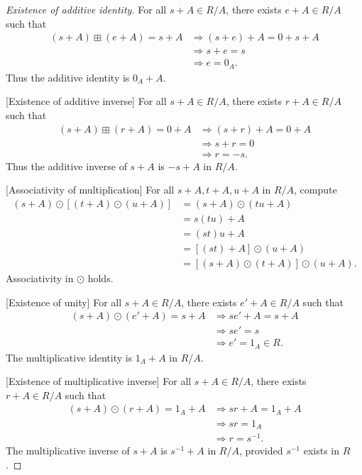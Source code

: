 \begin{proof}
    [Existence of additive identity] For all $s+A \in R/A$, there exists $e+A \in R/A$ such that 
    \begin{align*}
        (s + A) \boxplus (e+A) = s + A &\Rightarrow (s+e) + A = 0 + s + A\\
        &\Rightarrow s+e = s\\
        &\Rightarrow e = 0_A.
    \end{align*}
    Thus the additive identity is $0_A + A$.
    
    [Existence of additive inverse] For all $s+A \in R/A$, there exists $r+A \in R/A$ such that 
    \begin{align*}
        (s + A) \boxplus (r+A) = 0 + A &\Rightarrow (s+r) + A = 0 + A\\
        &\Rightarrow s+r = 0\\
        &\Rightarrow r =-s.
    \end{align*}
    Thus the additive inverse of $s+A$ is $-s+A$ in $R/A$.

    [Associativity of multiplication] For all $s+A, t+A, u+A$ in $R/A$, compute 
    \begin{align*}
        (s+A) \odot [(t+A) \odot (u+A)] &= (s+A) \odot (tu + A)\\
        &= s(tu) +A\\
        &= (st)u + A\\
        &= [(st)+A] \odot (u+A)\\
        &= [(s+A) \odot (t+A)] \odot (u+A).
    \end{align*}
    Associativity in $\odot$ holds.

    [Existence of unity] For all $s+A \in R/A$, there exists $e'+A \in R/A$ such that 
    \begin{align*}
        (s + A) \odot (e'+A) = s + A &\Rightarrow se'+A = s + A\\
        &\Rightarrow se' = s\\
        &\Rightarrow e' = 1_A \in R.
    \end{align*}
    The multiplicative identity is $1_A + A$ in $R/A$.

    [Existence of multiplicative inverse] For all $s+A \in R/A$, there exists $r+A \in R/A$ such that 
    \begin{align*}
        (s + A) \odot (r+A) = 1_A + A &\Rightarrow sr+A = 1_A + A\\
        &\Rightarrow sr = 1_A\\
        &\Rightarrow r = s^{-1}.
    \end{align*}
    The multiplicative inverse of $s+A$ is $s^{-1} + A$ in $R/A$, provided $s^{-1}$ exists in $R$.


\end{proof}
